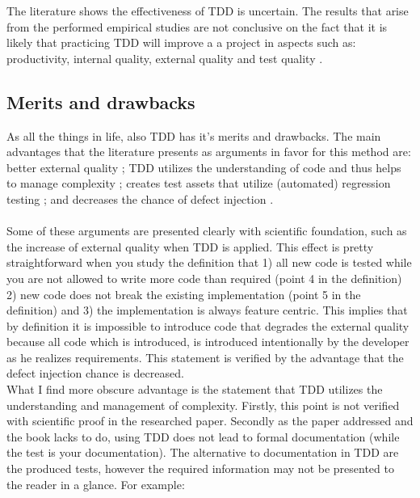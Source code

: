 The literature shows the effectiveness of TDD is uncertain. The results that arise from the performed empirical
studies are not conclusive on the fact that it is likely that practicing TDD will improve a a project in aspects such as:
productivity, internal quality, external quality and test quality \autocite{SAC-J-2003-GeorgeW04} \autocite{MAKING_SOFTWARE}.

\subsection*{Merits and drawbacks}

As all the things in life, also TDD has it's merits and drawbacks. The main advantages that the literature presents
as arguments in favor for this method are:
better external quality \autocite[340]{SAC-J-2003-GeorgeW04} \autocite[212]{MAKING_SOFTWARE};
TDD utilizes the understanding of code and thus helps to manage complexity \autocite[338]{SAC-J-2003-GeorgeW04};
creates test assets that utilize (automated) regression testing \autocite[338]{SAC-J-2003-GeorgeW04} \autocite[208]{MAKING_SOFTWARE};
and decreases the chance of defect injection \autocite[338]{SAC-J-2003-GeorgeW04}.

\paragraph{}
Some of these arguments are presented clearly with scientific foundation, such as the increase of external quality
when TDD is applied. This effect is pretty straightforward when you study the definition that 1) all new code is
tested while you are not allowed to write more code than required (point 4 in the definition) 2) new code does not
break the existing implementation (point 5 in the definition) and 3) the implementation is always feature centric.
This implies that by definition it is impossible to introduce code that degrades the external quality because all
code which is introduced, is introduced intentionally by the developer as he realizes requirements. This statement is
verified by the advantage that the defect injection chance is decreased.\\
What I find more obscure advantage is the statement that TDD utilizes the understanding and management of
complexity. Firstly, this point is not verified with scientific proof in the researched paper. Secondly as the
paper \autocite[338]{SAC-J-2003-GeorgeW04} addressed and the book lacks to do, using TDD does not lead to formal documentation (while the test is your
documentation). The alternative to documentation in TDD are the produced tests, however the required information may
not be presented to the reader in a glance. For example: \\

